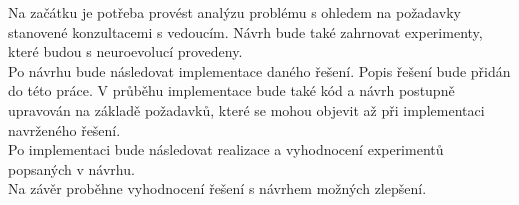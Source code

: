 Na začátku je potřeba provést analýzu problému s ohledem na požadavky stanovené konzultacemi s vedoucím. Návrh bude také zahrnovat experimenty, které budou s neuroevolucí provedeny. \\
Po návrhu bude následovat implementace daného řešení. Popis řešení bude přidán do této práce. V průběhu implementace bude také kód a návrh postupně upravován na základě požadavků, které se mohou objevit až při implementaci navrženého řešení. \\
Po implementaci bude následovat realizace a vyhodnocení experimentů popsaných v návrhu. \\
Na závěr proběhne vyhodnocení řešení s návrhem možných zlepšení.